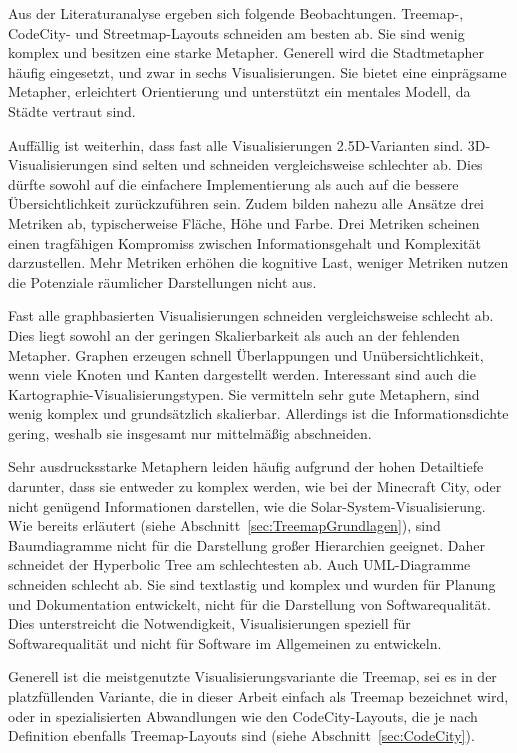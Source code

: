 Aus der Literaturanalyse ergeben sich folgende Beobachtungen. Treemap-, CodeCity- und Streetmap-Layouts schneiden am besten ab. Sie sind wenig komplex und besitzen eine starke Metapher. Generell wird die Stadtmetapher häufig eingesetzt, und zwar in sechs Visualisierungen. Sie bietet eine einprägsame Metapher, erleichtert Orientierung und unterstützt ein mentales Modell, da Städte vertraut sind.

Auffällig ist weiterhin, dass fast alle Visualisierungen 2{.}5D-Varianten sind. 3D-Visualisierungen sind selten und schneiden vergleichsweise schlechter ab. Dies dürfte sowohl auf die einfachere Implementierung als auch auf die bessere Übersichtlichkeit zurückzuführen sein. Zudem bilden nahezu alle Ansätze drei Metriken ab, typischerweise Fläche, Höhe und Farbe. Drei Metriken scheinen einen tragfähigen Kompromiss zwischen Informationsgehalt und Komplexität darzustellen. Mehr Metriken erhöhen die kognitive Last, weniger Metriken nutzen die Potenziale räumlicher Darstellungen nicht aus.

Fast alle graphbasierten Visualisierungen schneiden vergleichsweise schlecht ab. Dies liegt sowohl an der geringen Skalierbarkeit als auch an der fehlenden Metapher. Graphen erzeugen schnell Überlappungen und Unübersichtlichkeit, wenn viele Knoten und Kanten dargestellt werden. Interessant sind auch die Kartographie-Visualisierungstypen. Sie vermitteln sehr gute Metaphern, sind wenig komplex und grundsätzlich skalierbar. Allerdings ist die Informationsdichte gering, weshalb sie insgesamt nur mittelmäßig abschneiden.

Sehr ausdrucksstarke Metaphern leiden häufig aufgrund der hohen Detailtiefe darunter, dass sie entweder zu komplex werden, wie bei der Minecraft City, oder nicht genügend Informationen darstellen, wie die Solar-System-Visualisierung. Wie bereits erläutert (siehe Abschnitt~\ref{sec:TreemapGrundlagen}), sind Baumdiagramme nicht für die Darstellung großer Hierarchien geeignet. Daher schneidet der Hyperbolic Tree am schlechtesten ab. Auch UML-Diagramme schneiden schlecht ab. Sie sind textlastig und komplex und wurden für Planung und Dokumentation entwickelt, nicht für die Darstellung von Softwarequalität. Dies unterstreicht die Notwendigkeit, Visualisierungen speziell für Softwarequalität und nicht für Software im Allgemeinen zu entwickeln.

Generell ist die meistgenutzte Visualisierungsvariante die Treemap, sei es in der platzfüllenden Variante, die in dieser Arbeit einfach als Treemap bezeichnet wird, oder in spezialisierten Abwandlungen wie den CodeCity-Layouts, die je nach Definition ebenfalls Treemap-Layouts sind (siehe Abschnitt~\ref{sec:CodeCity}).

